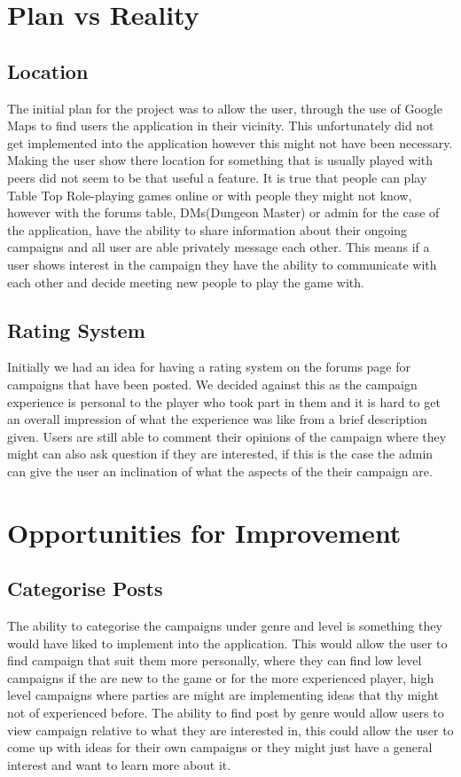 \section{Plan vs Reality}
\subsection{Location}
The initial plan for the project was to allow the user, through the use of Google Maps to find users the application in their vicinity.  This unfortunately did not get implemented into the application however this might not have been necessary.  Making the user show there location for something that is usually played with peers did not seem to be that useful a feature.  It is true that people can play Table Top Role-playing games online or with people they might not know, however with the forums table, DMs(Dungeon Master) or admin for the case of the application, have the ability to share information about their ongoing campaigns and all user are able privately message each other.  This means if a user shows interest in the campaign they have the ability to communicate with each other and decide meeting new people to play the game with.

\subsection{Rating System}
Initially we had an idea for having a rating system on the forums page for campaigns that have been posted.  We decided against this as the campaign experience is personal to the player who took part in them and it is hard to get an overall impression of what the experience was like from a brief description given.  Users are still able to comment their opinions of the campaign where they might can also ask question if they are interested, if this is the case the admin can give the user an inclination of what the aspects of the their campaign are.

\section{Opportunities for Improvement}
\subsection{Categorise Posts}
The ability to categorise the campaigns under genre and level is something they would have liked to implement into the application.  This would allow the user to find campaign that suit them more personally, where they can find low level campaigns if the are new to the game or for the more experienced player, high level campaigns where parties are might are implementing ideas that thy might not of experienced before.  The ability to find post by genre would allow users to view campaign relative to what they are interested in, this could allow the user to come up with ideas for their own campaigns or they might just have a general interest and want to learn more about it.

